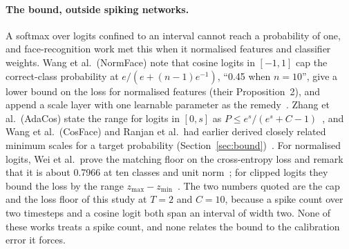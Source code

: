 \documentclass[10pt]{article}
\begin{document}
\paragraph{The bound, outside spiking networks.}
A softmax over logits confined to an interval cannot reach a probability of one, and
face-recognition work met this when it normalised features and classifier weights. Wang et
al.\ (NormFace) note that cosine logits in $[-1,1]$ cap the correct-class probability at
$e/(e+(n-1)e^{-1})$, ``0.45 when $n=10$'', give a lower bound on the loss for normalised features (their Proposition~2), and append a scale layer with
one learnable parameter as the remedy~\citep{wang2017normface}. %
Zhang et al.\ (AdaCos) state the range for logits in $[0,s]$ as $P\le e^{s}/(e^{s}+C-1)$~\citep{zhang2019adacos}, %
and Wang et al.\ (CosFace) and Ranjan et al.\ had earlier derived closely related minimum scales
for a target probability (Section~\ref{sec:bound})~\citep{wang2018cosface,ranjan2017l2}. %
For normalised logits, Wei et al.\ prove the matching floor on the cross-entropy loss and
remark that it is about 0.7966 at ten classes and unit norm~\citep{wei2022logitnorm}; %
for clipped logits they bound the loss by the range $z_{\max}-z_{\min}$~\citep{wei2023logitclip}. %
The two numbers quoted are the cap and the loss floor of this study at $T=2$ and $C=10$,
because a spike count over two timesteps and a cosine logit both span an interval of width two.
None of these works treats a spike count, and none relates the bound to the calibration error it
forces.
\end{document}

